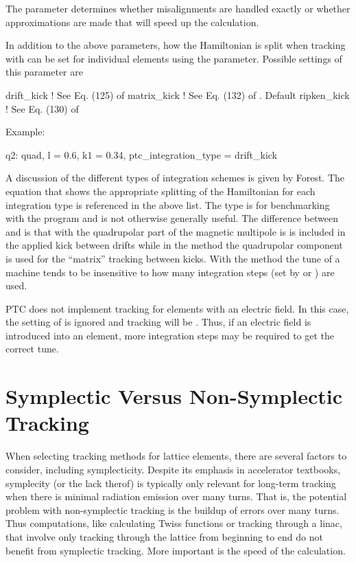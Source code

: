 The  parameter determines whether misalignments are handled exactly or
whether approximations are made that will speed up the calculation.

In addition to the above parameters, how the Hamiltonian is split when tracking with  can be
set for individual elements using the  parameter. Possible settings of this
parameter are
\begin{example}
  drift_kick    ! See Eq. (125) of \cite{b:geo.int}
  matrix_kick   ! See Eq. (132) of \cite{b:geo.int}. Default
  ripken_kick   ! See Eq. (130) of \cite{b:geo.int}
\end{example}
Example:
\begin{example}
  q2: quad, l = 0.6, k1 = 0.34, ptc_integration_type = drift_kick
\end{example}
A discussion of the different types of integration schemes is given by Forest\cite{b:geo.int}. The
equation that shows the appropriate splitting of the Hamiltonian for each integration type is
referenced in the above list. The  type is for benchmarking with the 
program and is not otherwise generally useful. The difference between  and
 is that with  the quadrupolar part of the magnetic multipole is is
included in the applied kick between drifts while in the  method the quadrupolar
component is used for the ``matrix'' tracking between kicks. With the  method the
tune of a machine tends to be insensitive to how many integration steps (set by  or
) are used.

PTC does not implement  tracking for elements with an electric field. In this case,
the setting of  is ignored and tracking will be . Thus, if
an electric field is introduced into an element, more integration steps may be required to get the
correct tune.

\section{Symplectic Versus Non-Symplectic Tracking}
\label{s:non.symp}

When selecting tracking methods for lattice elements, there are several factors to consider,
including symplecticity. Despite its emphasis in accelerator textbooks, symplecity (or the lack
therof) is typically only relevant for long-term tracking when there is minimal radiation emission
over many turns. That is, the potential problem with non-symplectic tracking is the buildup of
errors over many turns. Thus computations, like calculating Twiss functions or tracking through a
linac, that involve only tracking through the lattice from beginning to end do not benefit from
symplectic tracking. More important is the speed of the calculation.

